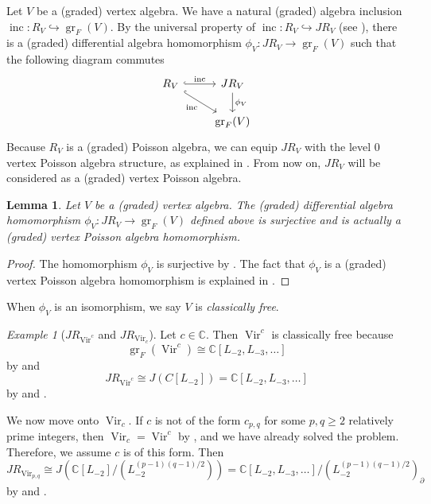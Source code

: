 \documentclass[a4paper, 12pt, reqno]{amsart}
\newtheorem{lemma}[theorem]{Lemma}
\theoremstyle{remark}
\newtheorem{example}[theorem]{Example}
\DeclareMathOperator{\Vir}{Vir}
\DeclareMathOperator{\gr}{gr}
\DeclareMathOperator{\inc}{inc}
\begin{document}
Let $V$ be a (graded) vertex algebra.
We have a natural (graded) algebra inclusion $\inc: R_V \hookrightarrow \gr_F(V)$.
By the universal property of $\inc: R_V \hookrightarrow JR_V$ (see ), there is a (graded) differential algebra homomorphism $\phi_V: JR_V \to \gr_F(V)$ such that the following diagram commutes
\begin{equation*}
  \begin{tikzcd}
    R_V \arrow[rd, "\inc"', hook] \arrow[r, "\inc", hook] & JR_V \arrow[d, "\phi_V"] \\
    & \gr_F(V)
  \end{tikzcd}
\end{equation*}
Because $R_V$ is a (graded) Poisson algebra, we can equip $JR_V$ with the level 0 vertex Poisson algebra structure, as explained in .
From now on, $JR_V$ will be considered as a (graded) vertex Poisson algebra.

\begin{lemma}
  \label{lmm:6}
  Let $V$ be a (graded) vertex algebra.
  The (graded) differential algebra homomorphism $\phi_V: JR_V \to \gr_F(V)$ defined above is surjective and is actually a (graded) vertex Poisson algebra homomorphism.
\end{lemma}

\begin{proof}
  The homomorphism $\phi_V$ is surjective by .
  The fact that $\phi_V$ is a (graded) vertex Poisson algebra homomorphism is explained in \cite[Proposition 2.5.1]{arakawa_remark_2012}.
\end{proof}

When $\phi_V$ is an isomorphism, we say $V$ is \emph{classically free}.

\begin{example}[$JR_{\Vir^c}$ and $JR_{\Vir_c}$]
  \label{exa:10}
  Let $c \in \mathbb{C}$.
  Then $\Vir^c$ is classically free because
  \begin{equation*}
    \gr_F(\Vir^c) \cong \mathbb{C}[L_{-2}, L_{-3}, \dots]
  \end{equation*}
  by  and
  \begin{equation*}
    JR_{\Vir^c} \cong J(C[L_{-2}]) = \mathbb{C}[L_{-2}, L_{-3}, \dots]
  \end{equation*}
  by  and .

  We now move onto $\Vir_c$.
  If $c$ is not of the form $c_{p, q}$ for some $p, q \ge 2$ relatively prime integers, then $\Vir_c = \Vir^c$ by , and we have already solved the problem.
  Therefore, we assume $c$ is of this form.
  Then
  \begin{equation*}
    JR_{\Vir_{p, q}} \cong J(\mathbb{C}[L_{-2}]/(L_{-2}^{(p - 1)(q - 1)/2})) = \mathbb{C}[L_{-2}, L_{-3}, \dots]/(L_{-2}^{(p - 1)(q - 1)/2})_{\partial}
  \end{equation*}
  by  and .
\end{example}
\end{document}
